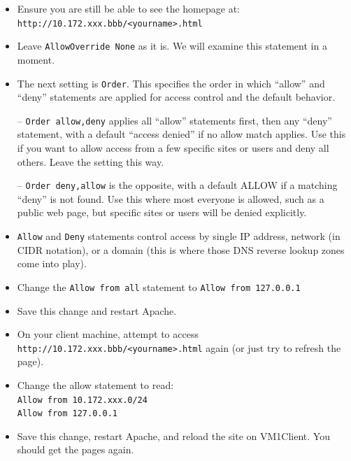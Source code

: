 \documentclass{article}
\begin{document}
\begin{itemize}

\item Ensure you are still be able to see the homepage at: {\tt http://10.172.xxx.bbb/<yourname>.html}
 
\item Leave {\tt AllowOverride None} as it is. We will examine this statement in a moment.

\item The next setting is {\tt Order}. This specifies the order in which ``allow'' and ``deny'' statements are applied for access control and the default behavior. 
\par -- {\tt Order allow,deny} applies all ``allow'' statements first, then any ``deny'' statement, with a default ``access denied'' if no allow match applies. Use this if you want to allow access from a few specific sites or users and deny all others.  Leave the setting this way.
\par -- {\tt Order deny,allow} is the opposite, with a default ALLOW if a matching ``deny'' is not found. Use this where most everyone is allowed, such as a public web page, but specific sites or users will be denied explicitly. 

\item {\tt Allow} and {\tt Deny} statements control access by single IP address, network (in CIDR notation), or a domain (this is where those DNS reverse lookup zones come into play). 

\item Change the {\tt Allow from all} statement to {\tt Allow from 127.0.0.1}
\item Save this change and restart Apache.

\item On your client machine, attempt to access {\tt http://10.172.xxx.bbb/<yourname>.html} again (or just try to refresh the page).
\end{itemize}

\begin{itemize}
\item Change the allow statement to read:	\\
{\tt Allow from 10.172.xxx.0/24} \\
{\tt Allow from 127.0.0.1}

\item Save this change, restart Apache, and reload the site on VM1Client. You should get the pages again. 
\end{itemize}
\end{document}
